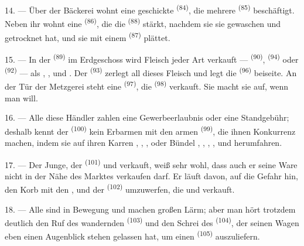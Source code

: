 14. --- Über der Bäckerei wohnt eine geschickte 
\textsuperscript{(84)}, die mehrere  \textsuperscript{(85)}
beschäftigt. Neben ihr wohnt eine 
\textsuperscript{(86)}, die die  \textsuperscript{(88)} stärkt, nachdem
sie sie gewaschen und getrocknet hat, und sie mit einem 
\textsuperscript{(87)} plättet.

\VUsaut{4.0mm}
\VUsaut{3.0mm}

15. --- In der  \textsuperscript{(89)} im Erdgeschoss wird Fleisch
jeder Art verkauft ---  \textsuperscript{(90)},
 \textsuperscript{(94)} oder 
\textsuperscript{(92)} --- als , ,
 und . Der 
\textsuperscript{(93)} zerlegt all dieses Fleisch und legt die
 \textsuperscript{(96)} beiseite. An der Tür der Metzgerei steht
eine  \textsuperscript{(97)}, die 
\textsuperscript{(98)} verkauft. Sie macht sie auf, wenn man will.

16. --- Alle diese Händler zahlen eine Gewerbeerlaubnis oder eine Standgebühr;
deshalb kennt der  \textsuperscript{(100)} kein Erbarmen mit den
armen  \textsuperscript{(99)}, die ihnen
Konkurrenz machen, indem sie auf ihren Karren ,
, ,  oder Bündel
, , , ,
 und  herumfahren.

\VUsaut{4.0mm}
\VUsaut{3.0mm}

17. --- Der Junge, der  \textsuperscript{(101)} und
 verkauft, weiß sehr wohl, dass auch er seine Ware nicht in der
Nähe des Marktes verkaufen darf. Er läuft davon, auf die Gefahr hin, den Korb mit den
,  und  der
 \textsuperscript{(102)} umzuwerfen, die  und
 verkauft.

18. --- Alle sind in Bewegung und machen großen Lärm; aber man hört trotzdem deutlich
den Ruf des wandernden  \textsuperscript{(103)} und den Schrei des
 \textsuperscript{(104)}, der seinen Wagen eben einen
Augenblick stehen gelassen hat, um einen 
\textsuperscript{(105)} auszuliefern.
\VUsaut{6.0mm}
\VUfilet{22mm}

